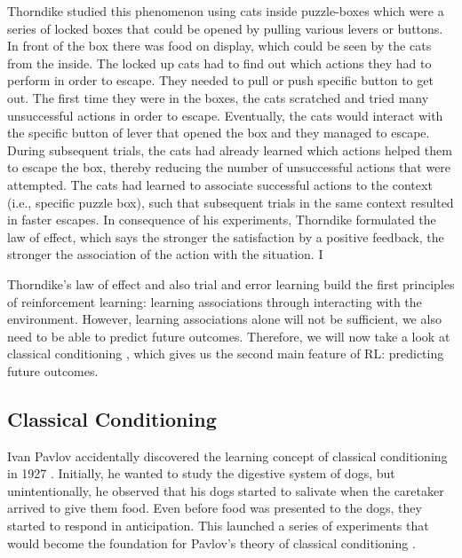 Thorndike studied this phenomenon using cats inside puzzle-boxes \citep[pp.8-30]{thorndike1898animal} which were a series of locked boxes that could be opened by pulling various levers or buttons.
In front of the box there was food on display, which could be seen by the cats from the inside. The locked up cats had to find out which actions they had to perform in order to escape. They needed to pull or push specific button to get out.
The first time they were in the boxes, the cats scratched and tried many unsuccessful actions in order to escape. Eventually, the cats would interact with the specific button of lever that opened the box and they managed to escape. During subsequent trials, the cats had already learned which actions helped them to escape the box, thereby reducing the number of unsuccessful actions that were attempted.
The cats had learned to associate successful actions to the context (i.e., specific puzzle box), such that subsequent trials in the same context resulted in faster escapes.
In consequence of his experiments, Thorndike formulated the law of effect, which says the stronger the satisfaction by a positive feedback, the stronger the association of the action with the situation. 
I%

Thorndike's law of effect and also trial and error learning build the first principles of reinforcement learning: learning associations through interacting with the environment. However, learning associations alone will not be sufficient, we also need to be able to predict future outcomes. Therefore, we will now take a look at classical conditioning , which gives us the second main feature of RL: predicting future outcomes. 

\subsection{Classical Conditioning}
Ivan Pavlov accidentally discovered the learning concept of classical conditioning in 1927 \citep{pavlov1927conditional}. Initially, he wanted to study the digestive system of dogs, but unintentionally, he observed that his dogs started to salivate when the caretaker arrived to give them food. Even before food was presented to the dogs, they started to respond in anticipation. This launched a series of experiments that would become the foundation for Pavlov's theory of classical conditioning \citep{pavlov1927conditional}.  

